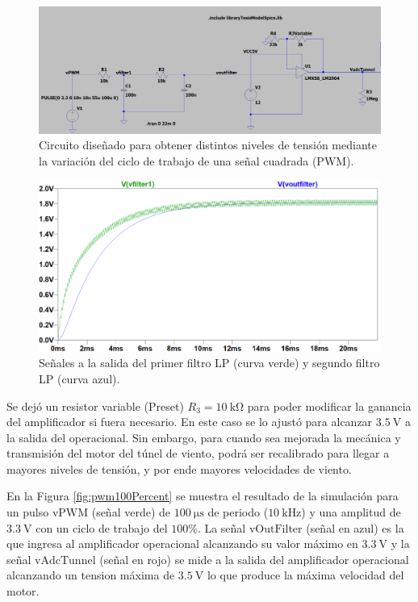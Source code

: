 \begin{figure}[H]
    \centering
    \includegraphics[width=1\linewidth]{Figuras/datalogger/Hardware/pwmCircuitSimulate.png}
    \caption{Circuito diseñado para obtener distintos niveles de tensión mediante la variación del ciclo de trabajo de una señal cuadrada (PWM).}
    \label{fig:pwmCircuitSimulate}
\end{figure}

\begin{figure}[H]
    \centering
    \includegraphics[width=1\linewidth]{Figuras/datalogger/Hardware/filter1and2.png}
    \caption{Señales a la salida del primer filtro LP (curva verde) y segundo filtro LP (curva azul).}
    \label{fig:filter1and2}
\end{figure}

Se dejó un resistor variable (Preset) $R_{3}=\SI{10}{\kilo\ohm}$ para poder modificar la ganancia del amplificador si fuera necesario. En este caso se lo ajustó para alcanzar $\SI{3.5}{\volt}$ a la salida del operacional. Sin embargo, para cuando sea mejorada la mecánica y transmisión del motor del túnel de viento, podrá ser recalibrado para llegar a mayores niveles de tensión, y por ende mayores velocidades de viento.

En la Figura \ref{fig:pwm100Percent} se muestra el resultado de la simulación para un pulso $\text{vPWM}$ (señal verde) de $\SI{100}{\micro\second}$ de periodo ($\SI{10}{\kilo\hertz}$) y una amplitud de $\SI{3.3}{\volt}$ con un ciclo de trabajo del $100\%$. La señal $\text{vOutFilter}$ (señal en azul) es la que ingresa al amplificador operacional alcanzando su valor máximo en $\SI{3.3}{\volt}$ y la señal $\text{vAdcTunnel}$ (señal en rojo) se mide a la salida del amplificador operacional alcanzando un tension máxima de $\SI{3.5}{\volt}$ lo que produce la máxima velocidad del motor.

